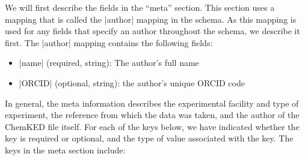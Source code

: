 \documentclass[12pt]{ijck}
\newcommand\ck{ChemKED}
\begin{document}
We will first describe the fields in the ``meta'' section.
This section uses a mapping that is called the \yabox|author| mapping in the schema. As this mapping
is used for any fields that specify an author throughout the schema, we describe it first.
The \yabox|author| mapping contains the following fields:
%
\begin{itemize}
    \item \yabox|name| (required, string): The author's full name
    \item \yabox|ORCID| (optional, string): the author's unique ORCID code
\end{itemize}
%
In general, the meta information describes the experimental facility and type of experiment, the
reference from which the data was taken, and the author of the \ck{} file itself. For each of the
keys below, we have indicated whether the key is required or optional, and the type of value
associated with the key. The keys in the meta section include:
%
\end{document}
